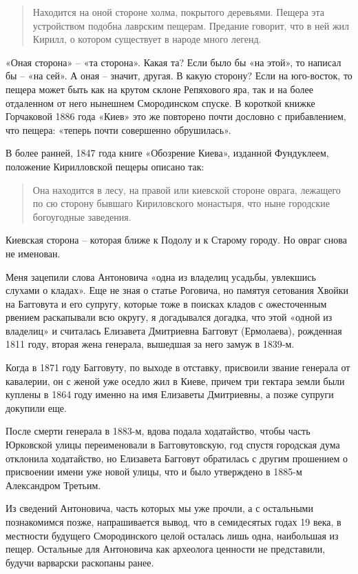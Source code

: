 \begin{quotation}
Находится на оной стороне холма, покрытого деревьями. Пещера эта устройством подобна лаврским пещерам. Предание говорит, что в ней жил Кирилл, о котором существует в народе много легенд.
\end{quotation}

«Оная сторона» – «та сторона». Какая та? Если было бы «на этой», то написал бы – «на сей». А оная – значит, другая. В какую сторону? Если на юго-восток, то пещера может быть как на крутом склоне Репяхового яра, так и на более отдаленном от него нынешнем Смородинском спуске. В короткой книжке Горчаковой 1886 года «Киев» это же повторено почти дословно с прибавлением, что пещера: «теперь почти совершенно обрушилась».

В более ранней, 1847 года книге «Обозрение Киева», изданной Фундуклеем, положение Кирилловской пещеры описано так:

\begin{quotation}
Она находится в лесу, на правой или киевской стороне оврага, лежащего по сю сторону бывшаго Кириловского монастыря, что ныне городские богоугодные заведения.
\end{quotation}

Киевская сторона – которая ближе к Подолу и к Старому городу. Но овраг снова не именован.

Меня зацепили слова Антоновича «одна из владелиц усадьбы, увлекшись слухами о кладах». Еще не зная о статье Роговича, но памятуя сетования Хвойки на Багговута и его супругу, которые тоже в поисках кладов с ожесточенным рвением раскапывали всю округу, я догадывался догадка, что этой «одной из владелиц» и считалась Елизавета Дмитриевна Багговут (Ермолаева), рожденная 1811 году, вторая жена генерала, вышедшая за него замуж в 1839-м. 

Когда в 1871 году Багговуту, по выходе в отставку, присвоили звание генерала от кавалерии, он с женой уже оседло жил в Киеве, причем три гектара земли были куплены в 1864 году именно на имя Елизаветы Дмитриевны, а позже супруги докупили еще.

После смерти генерала в 1883-м, вдова подала ходатайство, чтобы часть Юрковской улицы переименовали в Багговутовскую, год спустя городская дума отклонила ходатайство, но Елизавета Багговут обратилась с другим прошением о присвоении имени уже новой улицы, что и было утверждено в 1885-м Александром Третьим.

Из сведений Антоновича, часть которых мы уже прочли, а с остальными познакомимся позже, напрашивается вывод, что в семидесятых годах 19 века, в местности будущего Смородинского целой осталась лишь одна, наибольшая из пещер. Остальные для Антоновича как археолога ценности не представили, будучи варварски раскопаны ранее. 

